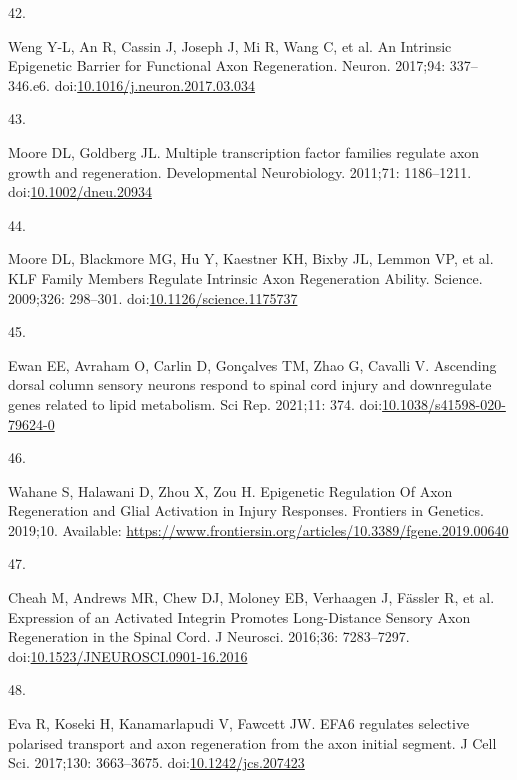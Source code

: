 \documentclass[
  12pt,
  a4paper,
]{book}
\newlength{\cslhangindent}
\newlength{\csllabelwidth}
\newenvironment{CSLReferences}[2] %
 {\begin{list}{}{%
  \setlength{\itemindent}{0pt}
  \setlength{\leftmargin}{0pt}
  \setlength{\parsep}{0pt}
  \ifodd #1
   \setlength{\leftmargin}{\cslhangindent}
   \setlength{\itemindent}{-1\cslhangindent}
  \fi
  \setlength{\itemsep}{#2\baselineskip}}}
 {\end{list}}
\newcommand{\CSLLeftMargin}[1]{\parbox[t]{\csllabelwidth}{\strut#1\strut}}
\newcommand{\CSLRightInline}[1]{\parbox[t]{\linewidth - \csllabelwidth}{\strut#1\strut}}
\begin{document}
\begin{CSLReferences}{0}{1}
\CSLLeftMargin{42. }%
\CSLRightInline{Weng Y-L, An R, Cassin J, Joseph J, Mi R, Wang C, et al. An {Intrinsic Epigenetic Barrier} for {Functional Axon Regeneration}. Neuron. 2017;94: 337--346.e6. doi:\href{https://doi.org/10.1016/j.neuron.2017.03.034}{10.1016/j.neuron.2017.03.034}}

\CSLLeftMargin{43. }%
\CSLRightInline{Moore DL, Goldberg JL. Multiple transcription factor families regulate axon growth and regeneration. Developmental Neurobiology. 2011;71: 1186--1211. doi:\href{https://doi.org/10.1002/dneu.20934}{10.1002/dneu.20934}}

\CSLLeftMargin{44. }%
\CSLRightInline{Moore DL, Blackmore MG, Hu Y, Kaestner KH, Bixby JL, Lemmon VP, et al. {KLF Family Members Regulate Intrinsic Axon Regeneration Ability}. Science. 2009;326: 298--301. doi:\href{https://doi.org/10.1126/science.1175737}{10.1126/science.1175737}}

\CSLLeftMargin{45. }%
\CSLRightInline{Ewan EE, Avraham O, Carlin D, Gonçalves TM, Zhao G, Cavalli V. Ascending dorsal column sensory neurons respond to spinal cord injury and downregulate genes related to lipid metabolism. Sci Rep. 2021;11: 374. doi:\href{https://doi.org/10.1038/s41598-020-79624-0}{10.1038/s41598-020-79624-0}}

\CSLLeftMargin{46. }%
\CSLRightInline{Wahane S, Halawani D, Zhou X, Zou H. Epigenetic {Regulation Of Axon Regeneration} and {Glial Activation} in {Injury Responses}. Frontiers in Genetics. 2019;10. Available: \url{https://www.frontiersin.org/articles/10.3389/fgene.2019.00640}}

\CSLLeftMargin{47. }%
\CSLRightInline{Cheah M, Andrews MR, Chew DJ, Moloney EB, Verhaagen J, Fässler R, et al. Expression of an {Activated Integrin Promotes Long-Distance Sensory Axon Regeneration} in the {Spinal Cord}. J Neurosci. 2016;36: 7283--7297. doi:\href{https://doi.org/10.1523/JNEUROSCI.0901-16.2016}{10.1523/JNEUROSCI.0901-16.2016}}

\CSLLeftMargin{48. }%
\CSLRightInline{Eva R, Koseki H, Kanamarlapudi V, Fawcett JW. {EFA6} regulates selective polarised transport and axon regeneration from the axon initial segment. J Cell Sci. 2017;130: 3663--3675. doi:\href{https://doi.org/10.1242/jcs.207423}{10.1242/jcs.207423}}


\end{CSLReferences}
\end{document}
